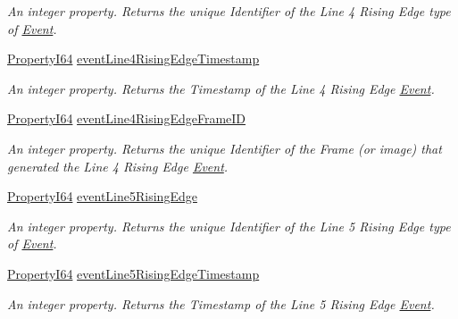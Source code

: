 \begin{DoxyCompactItemize}
\begin{DoxyCompactList}\small\item\em An integer property. Returns the unique Identifier of the Line 4 Rising Edge type of \hyperlink{classmv_i_m_p_a_c_t_1_1acquire_1_1_event}{Event}. \end{DoxyCompactList}\item 
\hyperlink{group___common_interface_ga81749b2696755513663492664a18a893}{Property\+I64} \hyperlink{classmv_i_m_p_a_c_t_1_1acquire_1_1_gen_i_cam_1_1_event_control_af6353485a730ba23dbc55d74a1f7e8f2}{event\+Line4\+Rising\+Edge\+Timestamp}
\begin{DoxyCompactList}\small\item\em An integer property. Returns the Timestamp of the Line 4 Rising Edge \hyperlink{classmv_i_m_p_a_c_t_1_1acquire_1_1_event}{Event}. \end{DoxyCompactList}\item 
\hyperlink{group___common_interface_ga81749b2696755513663492664a18a893}{Property\+I64} \hyperlink{classmv_i_m_p_a_c_t_1_1acquire_1_1_gen_i_cam_1_1_event_control_a51554cfb66277383c7e1973ccd296caa}{event\+Line4\+Rising\+Edge\+Frame\+I\+D}
\begin{DoxyCompactList}\small\item\em An integer property. Returns the unique Identifier of the Frame (or image) that generated the Line 4 Rising Edge \hyperlink{classmv_i_m_p_a_c_t_1_1acquire_1_1_event}{Event}. \end{DoxyCompactList}\item 
\hyperlink{group___common_interface_ga81749b2696755513663492664a18a893}{Property\+I64} \hyperlink{classmv_i_m_p_a_c_t_1_1acquire_1_1_gen_i_cam_1_1_event_control_af9bf5122828e416f21495c61bf56e3a5}{event\+Line5\+Rising\+Edge}
\begin{DoxyCompactList}\small\item\em An integer property. Returns the unique Identifier of the Line 5 Rising Edge type of \hyperlink{classmv_i_m_p_a_c_t_1_1acquire_1_1_event}{Event}. \end{DoxyCompactList}\item 
\hyperlink{group___common_interface_ga81749b2696755513663492664a18a893}{Property\+I64} \hyperlink{classmv_i_m_p_a_c_t_1_1acquire_1_1_gen_i_cam_1_1_event_control_a8ff5c8f8c049ba21b4536505c8a9ae9e}{event\+Line5\+Rising\+Edge\+Timestamp}
\begin{DoxyCompactList}\small\item\em An integer property. Returns the Timestamp of the Line 5 Rising Edge \hyperlink{classmv_i_m_p_a_c_t_1_1acquire_1_1_event}{Event}. \end{DoxyCompactList}\item 

\end{DoxyCompactItemize}
